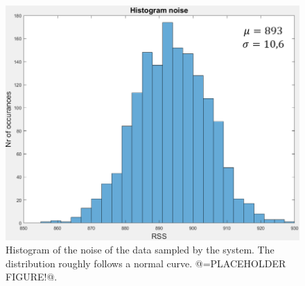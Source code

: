 \begin{figure}[!h]
	\includegraphics[width=\textwidth]{pics/histogram_noise_placeholder.png}
	\caption{Histogram of the noise of the data sampled by the system. The distribution roughly follows a normal curve. @=PLACEHOLDER FIGURE!@.}
	\label{fig:histogram_noise}
\end{figure}
